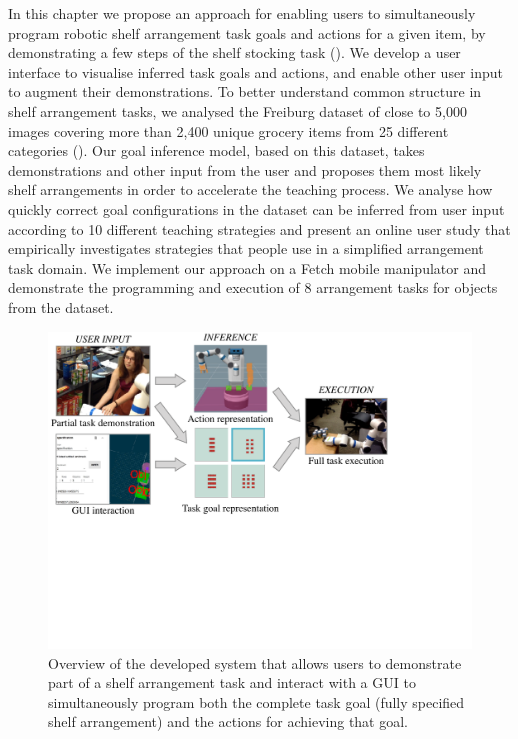 In this chapter we propose an approach for enabling users to simultaneously program robotic shelf arrangement task goals and actions for a given item, by demonstrating a few steps of the shelf stocking task (). 
We develop a user interface to visualise inferred task goals and actions, and enable other user input to augment their demonstrations. 
To better understand common structure in shelf arrangement tasks, we analysed the Freiburg dataset of close to 5,000 images covering more than 2,400 unique grocery items from 25 different categories (\cite{jund2016freiburg}). 
Our goal inference model, based on this dataset, takes demonstrations and other input from the user and proposes them most likely shelf arrangements in order to accelerate the teaching process.
We analyse how quickly correct goal configurations in the dataset can be inferred from user input according to 10 different teaching strategies and present an online user study that empirically investigates strategies that people use in a simplified arrangement task domain.
We implement our approach on a Fetch mobile manipulator and demonstrate the programming and execution of 8 arrangement tasks for objects from the dataset.

\begin{figure}[h]
	\centering
	\includegraphics[width=0.9\linewidth]{figures/iros-overview}
	\caption{Overview of the developed system that allows users to demonstrate part of a shelf arrangement task and interact with a GUI to simultaneously program both the complete task goal (fully specified shelf arrangement) and the actions for achieving that goal.}
	\label{fig:irosoverview}
\end{figure}

